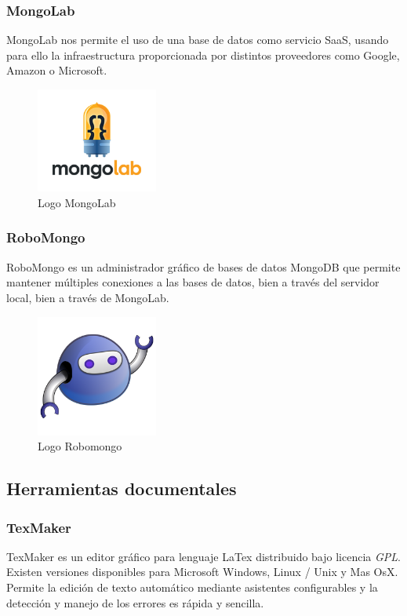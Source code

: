 		\subsubsection{MongoLab}
		MongoLab nos permite el uso de una base de datos como servicio \ac{SaaS}, usando para ello la infraestructura proporcionada por distintos proveedores como Google, Amazon o Microsoft.
				
		\begin{figure}[H]
		\centering
		\includegraphics[width=40mm, fbox={\fboxrule} 4mm]{images/04-metodo/33-mongolab-logo.png}
		\caption{Logo MongoLab}
		\label{fig:mongolab-logo}
		\end{figure}
		
		\subsubsection{RoboMongo}
		RoboMongo es un administrador gráfico de bases de datos MongoDB que permite mantener múltiples conexiones a las bases de datos, bien a través del servidor local, bien a través de MongoLab.
		
		\begin{figure}[H]
		\centering
		\includegraphics[width=40mm, fbox={\fboxrule} 4mm]{images/04-metodo/32-robomongo_logo.png}
		\caption{Logo Robomongo}
		\label{fig:robomongo-logo}
		\end{figure}
	
	\subsection{Herramientas documentales}
		\subsubsection{TexMaker}
		TexMaker es un editor gráfico para lenguaje LaTex distribuido bajo licencia \textit{\ac{GPL}}. Existen versiones disponibles para Microsoft Windows, Linux / Unix y Mas OsX. Permite la edición de texto automático mediante asistentes configurables y la detección y manejo de los errores es rápida y sencilla.
				
